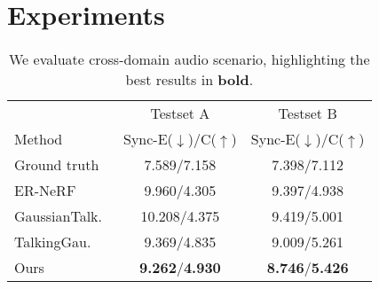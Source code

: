 \section{Experiments}
\label{sec:experiments}

\begin{table}[t]
    \centering
    \begin{tabular}{l|c|c}
    \hline
     & Testset A & Testset B \\
    Method & Sync-E($\downarrow$)/C($\uparrow$) & Sync-E($\downarrow$)/C($\uparrow$) \\
    \hline
    Ground truth & 7.589/7.158 & 7.398/7.112 \\
    \hline
    ER-NeRF~\cite{li2023efficient} & 9.960/4.305 & 9.397/4.938 \\
    GaussianTalk.~\cite{cho2024gaussiantalker} & 10.208/4.375 & 9.419/5.001 \\
    TalkingGau.~\cite{li2024talkinggaussian} & 9.369/4.835 & 9.009/5.261 \\
    \hline
    Ours & \textbf{9.262}/\textbf{4.930} & \textbf{8.746}/\textbf{5.426}  \\
    \hline
    \end{tabular}
    \caption{We evaluate cross-domain audio scenario, highlighting the best results in \textbf{bold}.}
    \label{tab:scenario 2}
    \vspace{-3mm}
\end{table}

